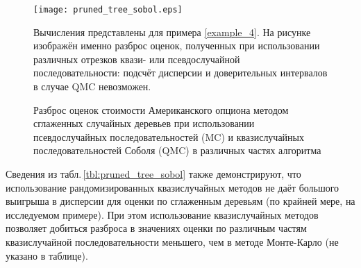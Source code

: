 \begin{figure}[h]
    \begin{center}
    \texttt{[image: pruned\_tree\_sobol.eps]}\end{center}
    \caption{Разброс оценок стоимости Американского опциона методом сглаженных случайных деревьев при использовании псевдослучайных последовательностей (MC) и квазислучайных последовательностей Соболя (QMC) в различных частях алгоритма}
    \label{fig:pruned_tree_sobol}
    \linespread{0.8}\footnotesize{Вычисления представлены для примера \ref{example_4}. На рисунке изображён именно разброс оценок, полученных при использовании различных отрезков квази- или псевдослучайной последовательности: подсчёт дисперсии и доверительных интервалов в случае QMC невозможен.}
\end{figure}

Сведения из табл.\,\ref{tbl:pruned_tree_sobol} также демонстрируют, что использование рандомизированных квазислучайных методов не даёт большого выигрыша в дисперсии для оценки по сглаженным деревьям (по крайней мере, на исследуемом примере). При этом использование квазислучайных методов позволяет добиться разброса в значениях оценки по различным частям квазислучайной последовательности меньшего, чем в методе Монте-Карло (не указано в таблице).


